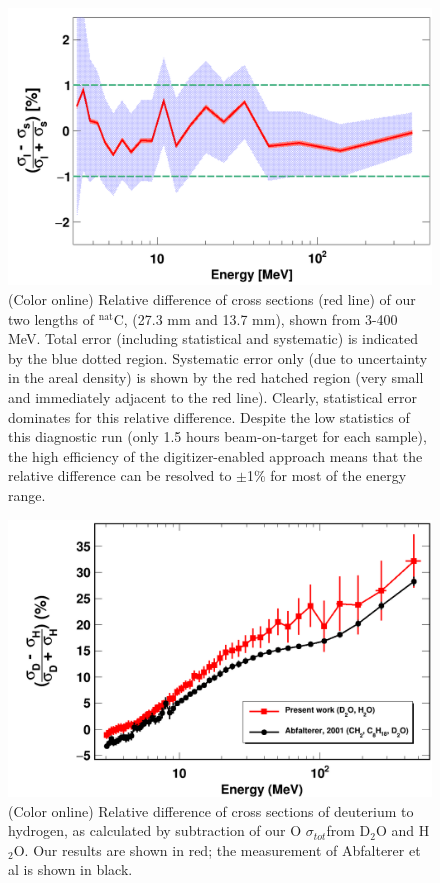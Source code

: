 \documentclass[twocolumn,secnumarabic,amssymb, nobibnotes, aps, prl,
superscriptaddress, nobalancelastpage]{revtex4}
\newcommand{\tot}{\ensuremath{\sigma_{tot}}}
\begin{document}
\begin{figure}
    \includegraphics[scale=0.30]{figures/relativeDiff_longCarbonShortCarbon.png}
    \caption{(Color online) Relative difference of cross sections (red line) of
        our two lengths of $^{\text{nat}}$C, (27.3 mm and 13.7 mm), shown from 3-400
        MeV. Total error
        (including statistical and systematic) is indicated by the blue
        dotted region. Systematic error only (due to uncertainty in the areal
        density) is shown by the red hatched region (very small and immediately adjacent to 
        the red line). Clearly, statistical error dominates for this relative
        difference.
        Despite the low statistics of this diagnostic run (only 1.5 hours
        beam-on-target for each sample), the high efficiency of the
        digitizer-enabled approach means that the relative difference can be resolved to 
        $\pm$1\% for most of the energy range.
    }
    \label{CarbonBenchmarking}
\end{figure}

\begin{figure}
    \includegraphics[scale=0.30]{figures/relativeDiff_DtoH.png}
    \caption{(Color online) Relative difference of cross sections of
        deuterium to hydrogen, as calculated by subtraction of our O \tot from
        D$_{2}$O and H$_{2}$O. Our results are shown in red; the measurement of
        Abfalterer et al \cite{Abfalterer1998} is shown in black.}
    \label{DtoH}
\end{figure}
\end{document}
